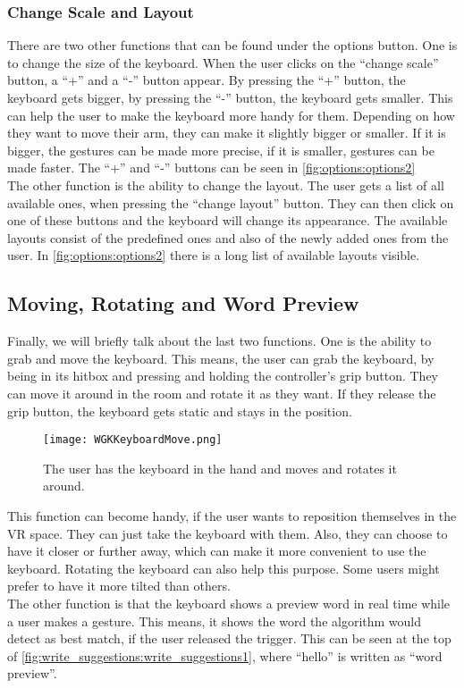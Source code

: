 \subsubsection{Change Scale and Layout}
There are two other functions that can be found under the options button. One is to change the size of the keyboard. When the user clicks on the ``change scale'' button, a ``+'' and a ``-'' button appear. By pressing the ``+'' button, the keyboard gets bigger, by pressing the ``-'' button, the keyboard gets smaller. This can help the user to make the keyboard more handy for them. Depending on how they want to move their arm, they can make it slightly bigger or smaller. If it is bigger, the gestures can be made more precise, if it is smaller, gestures can be made faster. The ``+'' and ``-'' buttons can be seen in \cref{fig:options:options2}\\
The other function is the ability to change the layout. The user gets a list of all available ones, when pressing the ``change layout'' button. They can then click on one of these buttons and the keyboard will change its appearance. The available layouts consist of the predefined ones and also of the newly added ones from the user. In \cref{fig:options:options2} there is a long list of available layouts visible.

\subsection{Moving, Rotating and Word Preview}
Finally, we will briefly talk about the last two functions. One is the ability to grab and move the keyboard. This means, the user can grab the keyboard, by being in its hitbox and pressing and holding the controller's grip button. They can move it around in the room and rotate it as they want. If they release the grip button, the keyboard gets static and stays in the position.
\begin{figure}[H]
    \centering
    \texttt{[image: WGKKeyboardMove.png]}
    \caption{The user has the keyboard in the hand and moves and rotates it around.}
    \label{fig:move}
\end{figure}
This function can become handy, if the user wants to reposition themselves in the VR space. They can just take the keyboard with them. Also, they can choose to have it closer or further away, which can make it more convenient to use the keyboard. Rotating the keyboard can also help this purpose. Some users might prefer to have it more tilted than others.\\
The other function is that the keyboard shows a preview word in real time while a user makes a gesture. This means, it shows the word the algorithm would detect as best match, if the user released the trigger. This can be seen at the top of \cref{fig:write_suggestions:write_suggestions1}, where ``hello'' is written as ``word preview''.